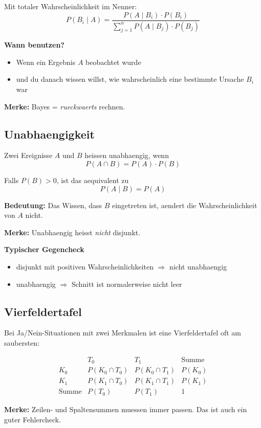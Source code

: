 \documentclass[a4paper,11pt]{article}
\begin{document}
Mit totaler Wahrscheinlichkeit im Nenner:
\[
P(B_i\mid A)=
\frac{P(A\mid B_i)\cdot P(B_i)}
{\sum_{j=1}^n P(A\mid B_j)\cdot P(B_j)}
\]

\textbf{Wann benutzen?}
\begin{itemize}
  \item Wenn ein Ergebnis $A$ beobachtet wurde
  \item und du danach wissen willst, wie wahrscheinlich eine bestimmte Ursache $B_i$ war
\end{itemize}

\textbf{Merke:}
Bayes = \emph{rueckwaerts} rechnen.

\subsection{Unabhaengigkeit}
Zwei Ereignisse $A$ und $B$ heissen unabhaengig, wenn
\[
P(A \cap B)=P(A)\cdot P(B)
\]

Falls $P(B)>0$, ist das aequivalent zu
\[
P(A\mid B)=P(A)
\]

\textbf{Bedeutung:}
Das Wissen, dass $B$ eingetreten ist, aendert die Wahrscheinlichkeit von $A$ nicht.

\textbf{Merke:}
Unabhaengig heisst \emph{nicht} disjunkt.

\textbf{Typischer Gegencheck}
\begin{itemize}
  \item disjunkt mit positiven Wahrscheinlichkeiten $\Rightarrow$ nicht unabhaengig
  \item unabhaengig $\Rightarrow$ Schnitt ist normalerweise nicht leer
\end{itemize}

\subsection{Vierfeldertafel}
Bei Ja/Nein-Situationen mit zwei Merkmalen ist eine Vierfeldertafel oft am saubersten:

\[
\begin{array}{c|cc|c}
 & T_0 & T_1 & \text{Summe} \\
\hline
K_0 & P(K_0\cap T_0) & P(K_0\cap T_1) & P(K_0) \\
K_1 & P(K_1\cap T_0) & P(K_1\cap T_1) & P(K_1) \\
\hline
\text{Summe} & P(T_0) & P(T_1) & 1
\end{array}
\]

\textbf{Merke:}
Zeilen- und Spaltensummen muessen immer passen. Das ist auch ein guter Fehlercheck.
\end{document}
